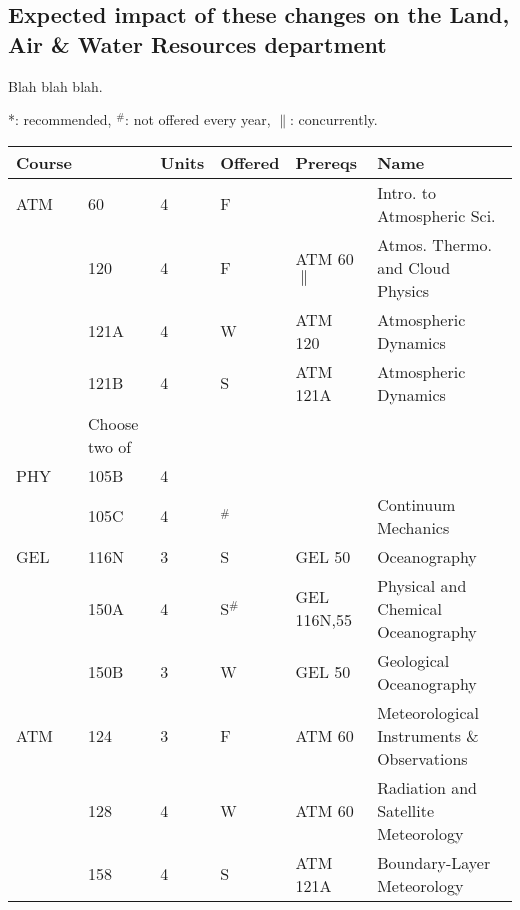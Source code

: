 \documentclass[12pt]{article}
\begin{document}
\subsection{Expected impact of these changes on the Land, Air \& Water Resources department}

Blah blah blah.

\newpage
{}
\vskip 0.25cm
\noindent
*: recommended, $^\#$: not offered every year, $\parallel$: concurrently.\\
\begin{tabular}{|llllll|}
\hline
Course & & Units & Offered & Prereqs & Name \\
\hline
ATM & 60     & 4 & F   & & Intro. to Atmospheric Sci. \\
    & 120    & 4 & F   & ATM 60$\parallel$ & Atmos. Thermo. and Cloud Physics \\
    & 121A   & 4 & W   & ATM 120 & Atmospheric Dynamics \\
    & 121B   & 4 & S   & ATM 121A & Atmospheric Dynamics \\
\hline
\hline
    & Choose two of & & & & \\
\hline
PHY  & 105B   & 4 & & & \\
     & 105C   & 4 & $^\#$  &             & Continuum Mechanics\\
GEL  & 116N   & 3 & S  & GEL 50      & Oceanography\\
     & 150A   & 4 & S$^\#$ & GEL 116N,55 & Physical and Chemical Oceanography\\
     & 150B   & 3 & W  & GEL 50      & Geological Oceanography\\
ATM  & 124    & 3 & F  & ATM 60      & Meteorological Instruments \& Observations \\
     & 128    & 4 & W  & ATM 60      & Radiation and Satellite Meteorology \\
     & 158    & 4 & S  & ATM 121A    & Boundary-Layer Meteorology \\
\hline
\end{tabular}\\
\end{document}
